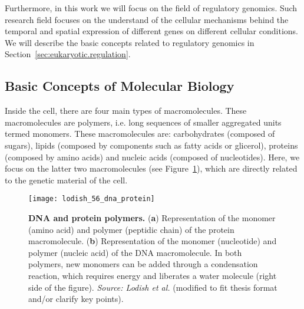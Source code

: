 Furthermore, in this work we will focus on the field of regulatory genomics. Such research field focuses on the understand of the cellular mechanisms behind the temporal and spatial expression of different genes on different cellular conditions. We will describe the basic concepts related to regulatory genomics in Section~\ref{sec:eukaryotic.regulation}.

\subsection{Basic Concepts of Molecular Biology}
\label{sec:basic.concepts.molecular.biology}

Inside the cell, there are four main types of macromolecules. These macromolecules are polymers, i.e. long sequences of smaller aggregated units termed monomers. These macromolecules are: carbohydrates (composed of sugars), lipids (composed by components such as fatty acids or glicerol), proteins (composed by amino acids) and nucleic acids (composed of nucleotides). Here, we focus on the latter two macromolecules (see Figure~\ref{fig:lodish_dna_protein}), which are directly related to the genetic material of the cell.

\begin{figure}[h!]
\centering
\texttt{[image: lodish\_56\_dna\_protein]}
\caption[DNA and protein polymers]{\textbf{DNA and protein polymers.} (\textbf{a}) Representation of the monomer (amino acid) and polymer (peptidic chain) of the protein macromolecule. (\textbf{b}) Representation of the monomer (nucleotide) and polymer (nucleic acid) of the DNA macromolecule. In both polymers, new monomers can be added through a condensation reaction, which requires energy and liberates a water molecule (right side of the figure). \emph{Source: Lodish et al.}\cite{lodish2007} (modified to fit thesis format and/or clarify key points).}
\label{fig:lodish_dna_protein}
\end{figure}

